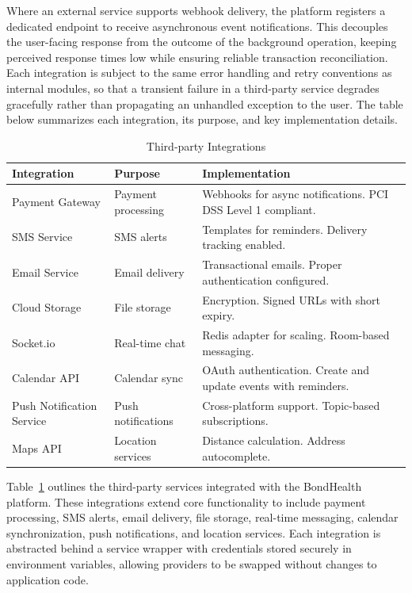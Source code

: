 \justifying
\noindent Where an external service supports webhook delivery, the platform registers a dedicated endpoint to receive asynchronous event notifications. This decouples the user-facing response from the outcome of the background operation, keeping perceived response times low while ensuring reliable transaction reconciliation. Each integration is subject to the same error handling and retry conventions as internal modules, so that a transient failure in a third-party service degrades gracefully rather than propagating an unhandled exception to the user. The table below summarizes each integration, its purpose, and key implementation details.

\begin{table}[H]
\small
\centering
\caption{Third-party Integrations}
\label{tab:integrations}
\renewcommand{\arraystretch}{1.3}
\begin{tabular}{|>{\raggedright\arraybackslash}p{3.0cm}|>{\raggedright\arraybackslash}p{2.8cm}|>{\raggedright\arraybackslash}p{7.6cm}|}
\hline
\textbf{Integration} & \textbf{Purpose} & \textbf{Implementation} \\
\hline
Payment Gateway & Payment processing & Webhooks for async notifications. PCI DSS Level 1 compliant. \\
\hline
SMS Service & SMS alerts & Templates for reminders. Delivery tracking enabled. \\
\hline
Email Service & Email delivery & Transactional emails. Proper authentication configured. \\
\hline
Cloud Storage & File storage & Encryption. Signed URLs with short expiry. \\
\hline
Socket.io & Real-time chat & Redis adapter for scaling. Room-based messaging. \\
\hline
Calendar API & Calendar sync & OAuth authentication. Create and update events with reminders. \\
\hline
Push Notification Service & Push notifications & Cross-platform support. Topic-based subscriptions. \\
\hline
Maps API & Location services & Distance calculation. Address autocomplete. \\
\hline
\end{tabular}
\end{table}
\noindent Table~\ref{tab:integrations} outlines the third-party services integrated with the BondHealth platform. These integrations extend core functionality to include payment processing, SMS alerts, email delivery, file storage, real-time messaging, calendar synchronization, push notifications, and location services. Each integration is abstracted behind a service wrapper with credentials stored securely in environment variables, allowing providers to be swapped without changes to application code.
\FloatBarrier


